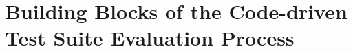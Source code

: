 \clearpage
\section{Building Blocks of the Code-driven Test Suite Evaluation Process}
\label{sec:limitations}











